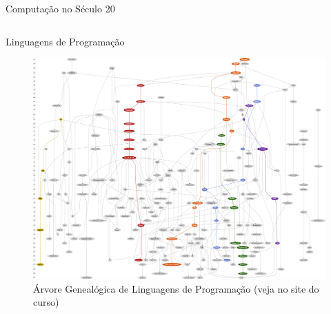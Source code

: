 \documentclass[10pt, compress, aspectratio=169, xcolor={table,usenames,dvipsnames}]{beamer}
\begin{document}
\begin{frame}[label={sec:org914c0dd}]{Computação no Século 20}
\begin{columns}
\begin{column}{0.5\columnwidth}
\end{column}
\end{columns}
\end{frame}

\begin{frame}[label={sec:org8666466}]{Linguagens de Programação}
\begin{figure}[htbp]
\centering
\includegraphics[width=.65\columnwidth]{../../../img/programming_language_tree.png}
\caption{Árvore Genealógica de \alert{Linguagens de Programação} (veja no \alert{site do curso})}
\end{figure}
\end{frame}
\end{document}
